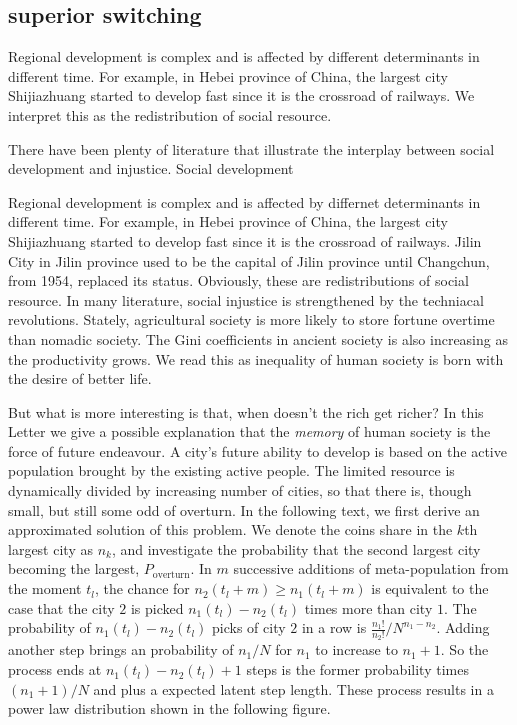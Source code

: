 \documentclass[aps,prl]{revtex4-1}
\begin{document}
\subsection{superior switching} 

Regional development is complex and is affected by different determinants in different time. For example, in Hebei province of China, the largest city Shijiazhuang started to develop fast since it is the crossroad of railways. We interpret this as the redistribution of social resource. 

There have been plenty of literature\cite{bowles2019neolithic} that illustrate the interplay between social development and injustice. Social development 

Regional development is complex and is affected by differnet determinants in different time. For example, in Hebei province of China, the largest city Shijiazhuang started to develop fast since it is the crossroad of railways. Jilin City in Jilin province used to be the capital of Jilin province until Changchun, from 1954, replaced its status. Obviously, these are redistributions of social resource. In many literature, social injustice is strengthened by the techniacal revolutions. Stately, agricultural society is more likely to store fortune overtime than nomadic society\cite{doi:10.1086/701789}. The Gini coefficients in ancient society is also increasing as the productivity grows\cite{kohler2017greater}. We read this as inequality of human society is born with the desire of better life. 

But what is more interesting is that, when doesn't the rich get richer? In this Letter we give a possible explanation that the \emph{memory} of human society is the force of future endeavour. A city's future ability to develop is based on the active population brought by the existing active people. The limited resource is dynamically divided by increasing number of cities, so that there is, though small, but still some odd of overturn. In the following text, we first derive an approximated solution of this problem. We denote the coins share in the $k$th largest city as $n_k$, and investigate the probability that the second largest city becoming the largest, $P_{\text{overturn}}$. In $m$ successive additions of meta-population from the moment $t_l$, the chance for $n_2(t_l+m)\ge n_1(t_l+m)$ is equivalent to the case that the city $2$ is picked $n_1(t_l)-n_2(t_l)$ times more than city $1$. The probability of $n_1(t_l)-n_2(t_l)$ picks of city $2$ in a row is $\frac{n_1!}{n_2!}/N^{n_1-n_2}$. Adding another step brings an probability of $n_1/N$ for $n_1$ to increase to $n_1+1$. So the process ends at $n_1(t_l)-n_2(t_l)+1$ steps is the former probability times $(n_1+1)/N$ and plus a expected latent step length. These process results in a power law distribution shown in the following figure.
\end{document}
